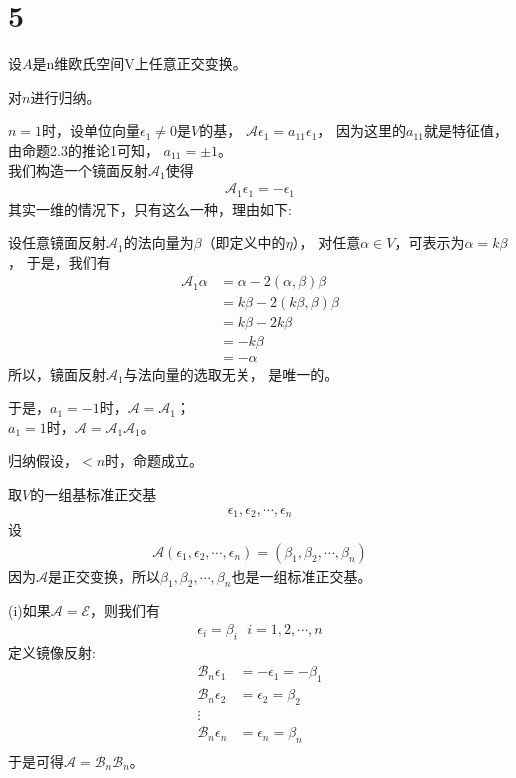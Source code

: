 \documentclass{article}
\begin{document}
\section*{5}

设$A$是n维欧氏空间V上任意正交变换。

对$n$进行归纳。

$n = 1$时，设单位向量$\epsilon_1 \neq 0$是$V$的基，
$\mathscr{A} \epsilon_1 = a_{11}\epsilon_1$，
因为这里的$a_{11}$就是特征值，由命题2.3的推论1可知，
$a_{11} = \pm 1$。\\
我们构造一个镜面反射$\mathscr{A}_1$使得
\begin{align*}
  \mathscr{A}_1 \epsilon_1 = -\epsilon_1
\end{align*}
其实一维的情况下，只有这么一种，理由如下:
\begin{zremark}
  设任意镜面反射$\mathscr{A}_1$的法向量为$\beta$（即定义中的$\eta$），
  对任意$\alpha \in V$，可表示为$\alpha = k \beta$，
  于是，我们有
  \begin{align*}
    \mathscr{A}_1 \alpha
     & = \alpha - 2(\alpha, \beta) \beta   \\
     & = k \beta - 2(k \beta, \beta) \beta \\
     & = k \beta - 2k \beta                \\
     & = -k \beta                          \\
     & = -\alpha
  \end{align*}
  所以，镜面反射$\mathscr{A}_1$与法向量的选取无关，
  是唯一的。
\end{zremark}
于是，$a_1 = -1$时，$\mathscr{A} = \mathscr{A}_1$；\\
$a_1 = 1$时，$\mathscr{A} = \mathscr{A}_1 \mathscr{A}_1$。

归纳假设，$< n$时，命题成立。

取$V$的一组基标准正交基
\begin{align*}
  \epsilon_1, \epsilon_2, \cdots, \epsilon_n
\end{align*}
设
\begin{align*}
  \mathscr{A}(\epsilon_1, \epsilon_2, \cdots, \epsilon_n)
  = (\beta_1, \beta_2, \cdots, \beta_n)
\end{align*}
因为$\mathscr{A}$是正交变换，所以$\beta_1, \beta_2, \cdots, \beta_n$也是一组标准正交基。

(i)如果$\mathscr{A} = \mathscr{E}$，则我们有
\begin{align*}
  \epsilon_i = \beta_i \ \ \ i = 1, 2, \cdots, n
\end{align*}
定义镜像反射:
\begin{align*}
  \mathscr{B}_n \epsilon_1 & = - \epsilon_1 = -\beta_1 \\
  \mathscr{B}_n \epsilon_2 & = \epsilon_2 = \beta_2    \\
  \vdots                                               \\
  \mathscr{B}_n \epsilon_n & = \epsilon_n = \beta_n    \\
\end{align*}
于是可得$\mathscr{A} = \mathscr{B}_n\mathscr{B}_n$。
\end{document}
